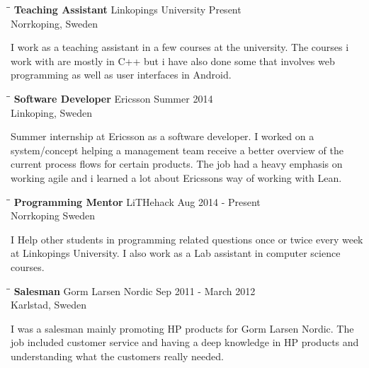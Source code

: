 \documentclass{res}
\begin{document}
\begin{resume}
     \begin{tabbing}
   \hspace{2.3in}\= \hspace{2.6in}\= \kill %
    {\bf Teaching Assistant} \>Linkopings University     \>Present\\
                             \>Norrkoping, Sweden
   \end{tabbing}\vspace{-20pt}      %
    I work as a teaching assistant in a few courses at the university. The courses i work with are mostly in C++ but i have also done some that involves web programming as well as user interfaces in Android.


   \begin{tabbing}
   \hspace{2.3in}\= \hspace{2.6in}\= \kill %
    {\bf Software Developer} \>Ericsson     \>Summer 2014\\
                             \>Linkoping, Sweden
   \end{tabbing}\vspace{-20pt}      %
    Summer internship at Ericsson as a software developer. I worked on a system/concept helping a management team receive a better overview of the current process flows for certain products. The job had a heavy emphasis on working agile and i learned a lot about Ericssons way of working with Lean.

   \begin{tabbing}
   \hspace{2.3in}\= \hspace{2.6in}\= \kill %
    {\bf Programming Mentor} \>LiTHehack \> Aug 2014 - Present\\
                          \>Norrkoping Sweden
   \end{tabbing}\vspace{-20pt}
    I Help other students in programming related questions once or twice every week at Linkopings University. I also work as a Lab assistant in computer science courses.

   \begin{tabbing}%
   \hspace{2.3in}\= \hspace{2.6in}\= \kill %
   {\bf Salesman}  \>Gorm Larsen Nordic \> Sep 2011 - March 2012\\
                          \>Karlstad, Sweden
   \end{tabbing}\vspace{-20pt}
    I was a salesman mainly promoting HP products for Gorm Larsen Nordic. The job included customer service and having a deep knowledge in HP products and understanding what the customers really needed.        



\end{resume}
\end{document}
